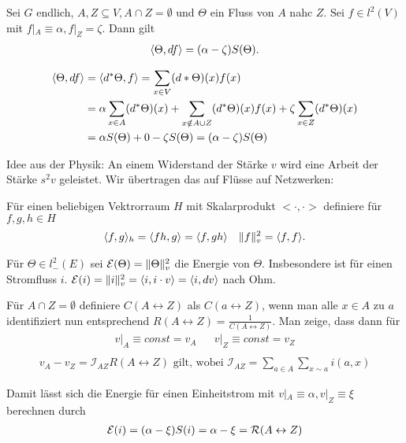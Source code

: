 \begin{lemma}
	Sei $G$ endlich, $A,Z \subseteq V, A\cap Z = \emptyset$ und $\Theta$ ein Fluss von $A$ nahc $Z$. Sei $f \in l^2(V)$ mit $f|_A \equiv \alpha, f|_Z = \zeta$. Dann gilt
	\begin{gather}
		\langle\Theta,df\rangle = (\alpha - \zeta) S(\Theta).
	\end{gather}
\end{lemma}
\begin{beweis}
	\begin{align}
		\langle\Theta,df\rangle &= \langle d^*\Theta,f\rangle = \sum\limits_{x \in V} (d*\Theta)(x)f(x) \\
			&= \alpha\sum\limits_{x\in A} (d^* \Theta)(x) + \sum\limits_{x \notin A \cup Z} (d^*\Theta)(x)f(x) + \zeta\sum\limits_{x\in Z} (d^*\Theta)(x) \\
			&= \alpha S(\Theta) + 0 - \zeta S(\Theta)  = (\alpha - \zeta) S(\Theta)
	\end{align}
\end{beweis}
Idee aus der Physik: An einem Widerstand der Stärke $v$ wird eine Arbeit der Stärke $s^2v$ geleistet. Wir übertragen das auf Flüsse auf Netzwerken:
\begin{definition}
	Für einen beliebigen Vektrorraum $H$ mit Skalarprodukt $<\cdot,\cdot>$ definiere für $f,g,h \in H$
	\begin{align}
		\langle f,g\rangle_h = \langle fh,g\rangle = \langle f,gh\rangle && \lVert f\rVert^2_v = \langle f,f\rangle.
	\end{align}
\end{definition}
Für $\Theta \in l^2_-(E)$ sei $\mathcal{E}(\Theta) = \lVert\Theta\rVert^2_v$ die Energie von $\Theta$. Insbesondere ist für einen Stromfluss $i$. $\mathcal{E}(i) = \lVert i\rVert^2_v = \langle i,i\cdot v\rangle  =\langle i, dv\rangle$ nach Ohm.

\begin{uebung}
	Für $A\cap Z = \emptyset$ definiere $C(A \leftrightarrow Z)$ als $C(a \leftrightarrow Z)$, wenn man alle $x \in A$ zu $a$ identifiziert nun entsprechend $R(A \leftrightarrow Z) = \frac{1}{C(A \leftrightarrow Z)}$. Man zeige, dass dann für 
	\begin{align} 
		v|_A \equiv const = v_A && v|_Z \equiv const = v_Z \\ 
	\end{align}
	\begin{align}
		v_A - v_Z = \mathcal{I}_{AZ}R(A \leftrightarrow Z) \text{ gilt, wobei } \mathcal{I}_{AZ} = \sum\limits_{a \in A}\sum\limits_{x \sim a}i(a,x)
	\end{align}
	
	Damit lässt sich die Energie für einen Einheitstrom mit $v|_A \equiv \alpha, v|_Z \equiv \xi$ berechnen durch 
	\begin{align}
		\mathcal{E}(i) = \enb{\alpha - \xi} S(i) = \alpha - \xi = \mathcal{R}(A \leftrightarrow Z)
	\end{align}
\end{uebung}

